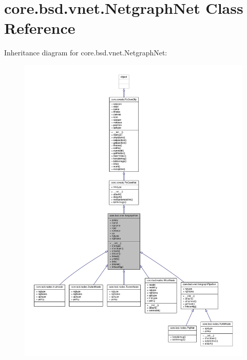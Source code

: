 \hypertarget{classcore_1_1bsd_1_1vnet_1_1_netgraph_net}{\section{core.\+bsd.\+vnet.\+Netgraph\+Net Class Reference}
\label{classcore_1_1bsd_1_1vnet_1_1_netgraph_net}
}


Inheritance diagram for core.\+bsd.\+vnet.\+Netgraph\+Net\+:
\nopagebreak
\begin{figure}[H]
\begin{center}
\leavevmode
\includegraphics[width=350pt]{classcore_1_1bsd_1_1vnet_1_1_netgraph_net__inherit__graph}
\end{center}
\end{figure}



